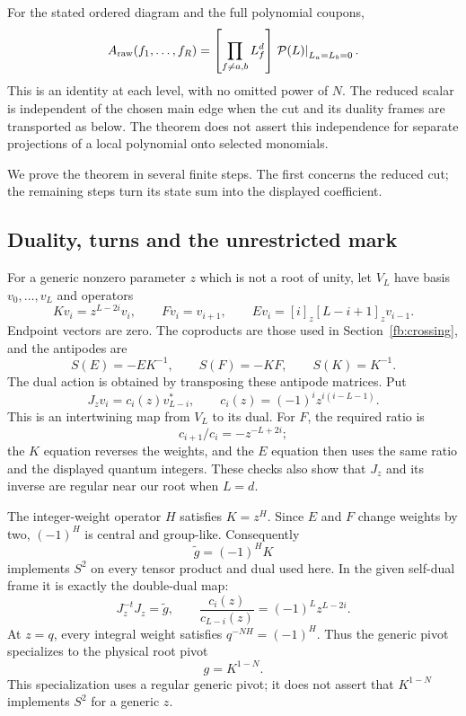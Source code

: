 \begin{theorem}
\label{de:coefficient-theorem}
For the stated ordered diagram and the full polynomial coupons,
\begin{equation}\label{de:coefficient}
 A_{\rm raw}(f_1,\ldots,f_R)
 =\left[\prod_{f\ne a,b}L_f^d\right]
       \left.\mathcal P(L)\right|_{L_a=L_b=0}.
\end{equation}
This is an identity at each level, with no omitted power of \(N\).
The reduced scalar is independent of the chosen main edge when the
cut and its duality frames are transported as below. The theorem
does not assert this independence for separate projections of a
local polynomial onto selected monomials.
\end{theorem}

We prove the theorem in several finite steps. The first concerns
the reduced cut; the remaining steps turn its state sum into the
displayed coefficient.

\subsection{Duality, turns and the unrestricted mark}

For a generic nonzero parameter \(z\) which is not a root of unity,
let \(V_L\) have basis \(v_0,\ldots,v_L\) and operators
\[
 Kv_i=z^{L-2i}v_i,\qquad
 Fv_i=v_{i+1},\qquad
 Ev_i=[i]_z[L-i+1]_zv_{i-1}.
\]
Endpoint vectors are zero. The coproducts are those used in
Section~\ref{fb:crossing}, and the antipodes are
\[
 S(E)=-EK^{-1},\qquad S(F)=-KF,\qquad S(K)=K^{-1}.
\]
The dual action is obtained by transposing these antipode matrices.
Put
\begin{equation}\label{de:J}
 J_zv_i=c_i(z)v_{L-i}^*,\qquad
 c_i(z)=(-1)^iz^{i(i-L-1)}.
\end{equation}
This is an intertwining map from \(V_L\) to its dual. For \(F\),
the required ratio is
\[
 c_{i+1}/c_i=-z^{-L+2i};
\]
the \(K\) equation reverses the weights, and the \(E\) equation then
uses the same ratio and the displayed quantum integers. These
checks also show that \(J_z\) and its inverse are regular near our
root when \(L=d\).

The integer-weight operator \(H\) satisfies \(K=z^H\). Since \(E\)
and \(F\) change weights by two, \((-1)^H\) is central and
group-like. Consequently
\[
              \widetilde g=(-1)^HK
\]
implements \(S^2\) on every tensor product and dual used here.
In the given self-dual frame it is exactly the double-dual map:
\[
 J_z^{-t}J_z=\widetilde g,\qquad
 \frac{c_i(z)}{c_{L-i}(z)}=(-1)^Lz^{L-2i}.
\]
At \(z=q\), every integral weight satisfies \(q^{-NH}=(-1)^H\).
Thus the generic pivot specializes to the physical root pivot
\begin{equation}\label{de:pivot}
                       g=K^{1-N}.
\end{equation}
This specialization uses a regular generic pivot; it does not
assert that \(K^{1-N}\) implements \(S^2\) for a generic \(z\).

